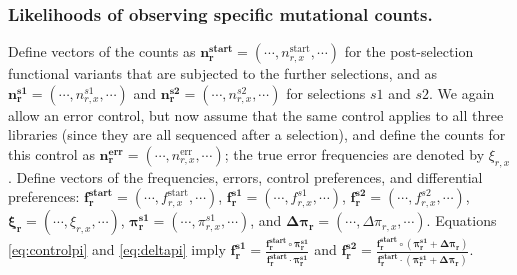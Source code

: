 \documentclass[twocolumn]{bmcart}%
\begin{document}
\subsubsection*{Likelihoods of observing specific mutational counts.}
Define vectors of the counts as $\mathbf{n_r^{\textbf{start}}}= \left(\cdots, n_{r,x}^{\textrm{start}}, \cdots\right)$ for the post-selection functional variants that are subjected to the further selections, and as $\mathbf{n_r^{s1}}= \left(\cdots, n_{r,x}^{s1}, \cdots\right)$ and $\mathbf{n_r^{s2}}= \left(\cdots, n_{r,x}^{s2}, \cdots\right)$ for selections $s1$ and $s2$. We again allow an error control, but now assume that the same control applies to all three libraries (since they are all sequenced after a selection), and define the counts for this control as $\mathbf{n_r^{\textbf{err}}}= \left(\cdots, n_{r,x}^{\textrm{err}}, \cdots\right)$; the true error frequencies are denoted by $\xi_{r,x}$. Define vectors of the frequencies, errors, control preferences, and differential preferences: $\boldsymbol{\mathbf{f_r^{\textbf{start}}}}= \left(\cdots, f_{r,x}^{\textrm{start}}, \cdots\right)$, $\boldsymbol{\mathbf{f_r^{s1}}}= \left(\cdots, f_{r,x}^{s1}, \cdots\right)$, $\boldsymbol{\mathbf{f_r^{s2}}}= \left(\cdots, f_{r,x}^{s2}, \cdots\right)$, $\boldsymbol{\mathbf{\xi_r}}= \left(\cdots, \xi_{r,x}, \cdots\right)$, $\boldsymbol{\mathbf{\pi^{s1}_r}}= \left(\cdots, \pi^{s1}_{r,x}, \cdots\right)$, and $\boldsymbol{\mathbf{\Delta\pi_r}}= \left(\cdots, \Delta\pi_{r,x}, \cdots\right)$. Equations \ref{eq:controlpi} and \ref{eq:deltapi} imply
$\boldsymbol{\mathbf{f_r^{s1}}}= \frac{\boldsymbol{\mathbf{f_r^{\textbf{start}}}}\circ \boldsymbol{\mathbf{\pi_r^{s1}}}}{\boldsymbol{\mathbf{f_r^{\textbf{start}}}}\cdot \boldsymbol{\mathbf{\pi_r^{s1}}}}$ and $\boldsymbol{\mathbf{f_r^{s2}}} = \frac{\boldsymbol{\mathbf{f_r^{\textbf{start}}}}\circ \left(\boldsymbol{\mathbf{\pi_r^{s1}}} + \boldsymbol{\mathbf{\Delta\pi_r}}\right)}{\boldsymbol{\mathbf{f_r^{\textbf{start}}}}\cdot \left(\boldsymbol{\mathbf{\pi_r^{s1}}} + \boldsymbol{\mathbf{\Delta\pi_r}}\right)}$.
\end{document}
